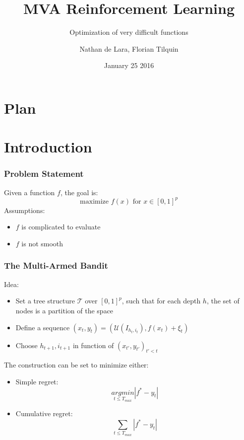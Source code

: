 \documentclass[xcolor={usenames,dvipsnames}]{beamer}
\begin{document}

\title{MVA Reinforcement Learning}
\subtitle{Optimization of very difficult functions}
\author{Nathan de Lara, Florian Tilquin}
\date{January 25 2016}


\begin{frame}
\titlepage
\end{frame}

\usebackgroundtemplate{ }

\section*{Plan}
\begin{frame}
  \tableofcontents[]
\end{frame}

\section{Introduction}
\begin{frame}
\frametitle{Problem Statement}
Given a function $f$, the goal is:
\begin{equation}
\mbox{maximize } f(x) \mbox{ for } x\in [0,1]^p
\end{equation}
Assumptions:
\begin{itemize}
\item $f$ is complicated to evaluate
\item $f$ is not smooth
\end{itemize}
\end{frame}

\begin{frame}
\frametitle{The Multi-Armed Bandit}
Idea:
\begin{itemize}
\item Set a tree structure $\mathcal{T}$ over $[0,1]^p$, such that for each depth $h$, the set of nodes is a partition of the space
\item Define a sequence $(x_t,y_t)=(\mathcal{U}(I_{h_t,i_t}),f(x_t)+\xi_t)$
\item Choose $h_{t+1},i_{t+1}$ in function of $(x_{t'},y_{t'})_{t'<t}$
\end{itemize}
The construction can be set to minimize either:
\begin{itemize}
\item Simple regret: \begin{equation}
\underset{t\le T_{max}}{argmin}|f^*-y_t|
\end{equation}
\item Cumulative regret: \begin{equation}\underset{t\le T_{max}}{\sum}|f^*-y_t| \end{equation}
\end{itemize}
\end{frame}
\end{document}
